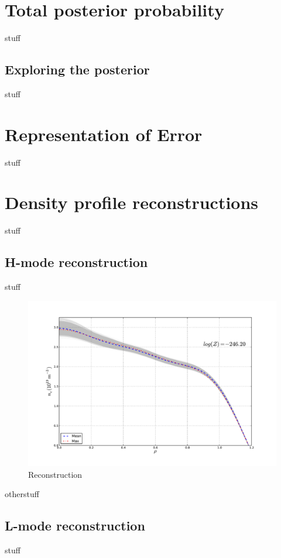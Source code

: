 \documentclass	[12pt]{article}
\begin{document}
\section{Total posterior probability}
stuff
\subsection{Exploring the posterior}
stuff
\section{Representation of Error}
stuff
\section{Density profile reconstructions}
stuff
\subsection{H-mode reconstruction}
stuff
\begin{figure}[ht]
	\centering
	\includegraphics[width=12cm,keepaspectratio=true]{figures/bfit146102_00505_all5}
	\vspace{-30pt}
	\caption{Reconstruction}
\label{hi}
\end{figure}
otherstuff
\subsection{L-mode reconstruction}
stuff
\end{document}
